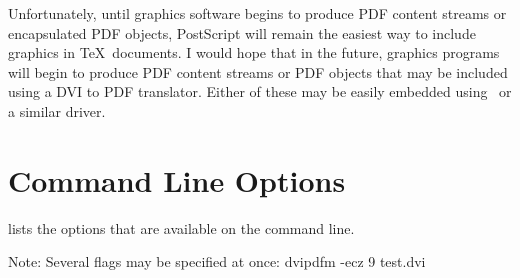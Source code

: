 Unfortunately, until graphics software
begins to produce PDF content streams or encapsulated
PDF objects, PostScript will remain the easiest
way to include graphics in \TeX\ documents.
I would hope that in the future, graphics programs
will begin to produce PDF content streams or PDF objects that
may be included using a DVI to PDF translator.  Either
of these may be easily embedded using \dvipdfm\ or a similar driver.

\section{Command Line Options}
 lists the options
that are available on the command line.
\par\noindent
Note: Several flags may be specified at once:
\example
\begintt
dvipdfm -ecz 9 test.dvi
\endtt

